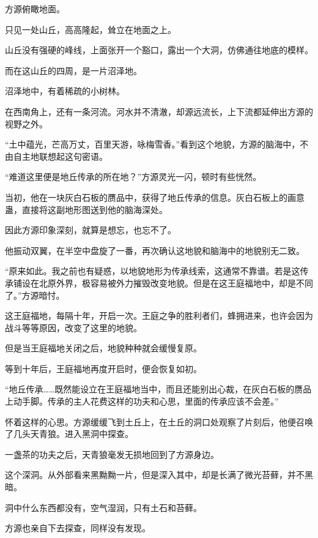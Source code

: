 
\begin{this_body}



方源俯瞰地面。

只见一处山丘，高高隆起，耸立在地面之上。

山丘没有强硬的峰线，上面张开一个豁口，露出一个大洞，仿佛通往地底的模样。

而在这山丘的四周，是一片沼泽地。

沼泽地中，有着稀疏的小树林。

在西南角上，还有一条河流。河水并不清澈，却源远流长，上下流都延伸出方源的视野之外。

“土中蕴光，芒高万丈，百里天游，咏梅雪香。”看到这个地貌，方源的脑海中，不由自主地联想起这句密语。

“难道这里便是地丘传承的所在地？”方源灵光一闪，顿时有些恍然。

当初，他在一块灰白石板的赝品中，获得了地丘传承的信息。灰白石板上的画意蛊，直接将这副地形图送到他的脑海深处。

因此方源印象深刻，就算是想忘，也忘不了。

他振动双翼，在半空中盘旋了一番，再次确认这地貌和脑海中的地貌别无二致。

“原来如此。我之前也有疑惑，以地貌地形为传承线索，这通常不靠谱。若是这传承铺设在北原外界，极容易被外力摧毁改变地貌。但是在这王庭福地中，却是不同了。”方源暗忖。

这王庭福地，每隔十年，开启一次。王庭之争的胜利者们，蜂拥进来，也许会因为战斗等等原因，改变了这里的地貌。

但是当王庭福地关闭之后，地貌种种就会缓慢复原。

等到十年后，王庭福地再度开启时，便会恢复如初。

“地丘传承……既然能设立在王庭福地当中，而且还能别出心裁，在灰白石板的赝品上动手脚。传承的主人花费这样的功夫和心思，里面的传承应该不会差。”

怀着这样的心思。方源缓缓飞到土丘上，在土丘的洞口处观察了片刻后，他便召唤了几头天青狼。进入黑洞中探查。

一盏茶的功夫之后，天青狼毫发无损地回到了方源身边。

这个深洞。从外部看来黑黝黝一片，但是深入其中，却是长满了微光苔藓，并不黑暗。

洞中什么东西都没有，空气湿润，只有土石和苔藓。

方源也亲自下去探查，同样没有发现。


\end{this_body}
